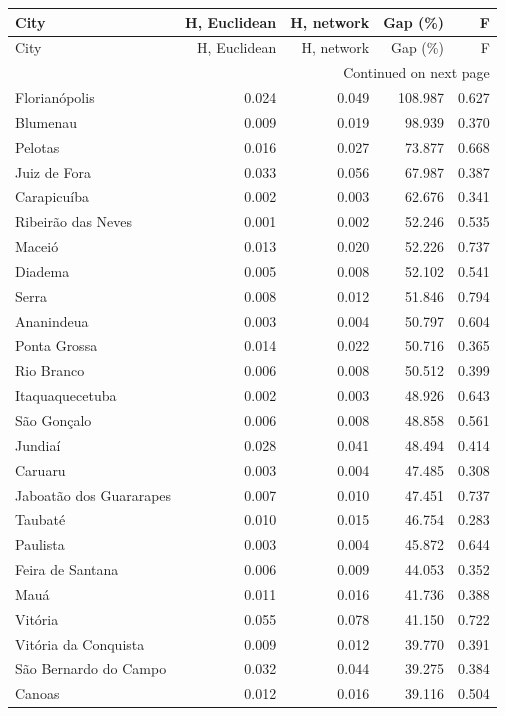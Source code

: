 \begin{longtable}{lrrrr}
\toprule
City & H, Euclidean & H, network & Gap (\%) & F \\
\midrule
\endfirsthead
\toprule
City & H, Euclidean & H, network & Gap (\%) & F \\
\midrule
\endhead
\midrule
\multicolumn{5}{r}{Continued on next page} \\
\midrule
\endfoot
\bottomrule
\endlastfoot
Florianópolis & 0.024 & 0.049 & 108.987 & 0.627 \\
Blumenau & 0.009 & 0.019 & 98.939 & 0.370 \\
Pelotas & 0.016 & 0.027 & 73.877 & 0.668 \\
Juiz de Fora & 0.033 & 0.056 & 67.987 & 0.387 \\
Carapicuíba & 0.002 & 0.003 & 62.676 & 0.341 \\
Ribeirão das Neves & 0.001 & 0.002 & 52.246 & 0.535 \\
Maceió & 0.013 & 0.020 & 52.226 & 0.737 \\
Diadema & 0.005 & 0.008 & 52.102 & 0.541 \\
Serra & 0.008 & 0.012 & 51.846 & 0.794 \\
Ananindeua & 0.003 & 0.004 & 50.797 & 0.604 \\
Ponta Grossa & 0.014 & 0.022 & 50.716 & 0.365 \\
Rio Branco & 0.006 & 0.008 & 50.512 & 0.399 \\
Itaquaquecetuba & 0.002 & 0.003 & 48.926 & 0.643 \\
São Gonçalo & 0.006 & 0.008 & 48.858 & 0.561 \\
Jundiaí & 0.028 & 0.041 & 48.494 & 0.414 \\
Caruaru & 0.003 & 0.004 & 47.485 & 0.308 \\
Jaboatão dos Guararapes & 0.007 & 0.010 & 47.451 & 0.737 \\
Taubaté & 0.010 & 0.015 & 46.754 & 0.283 \\
Paulista & 0.003 & 0.004 & 45.872 & 0.644 \\
Feira de Santana & 0.006 & 0.009 & 44.053 & 0.352 \\
Mauá & 0.011 & 0.016 & 41.736 & 0.388 \\
Vitória & 0.055 & 0.078 & 41.150 & 0.722 \\
Vitória da Conquista & 0.009 & 0.012 & 39.770 & 0.391 \\
São Bernardo do Campo & 0.032 & 0.044 & 39.275 & 0.384 \\
Canoas & 0.012 & 0.016 & 39.116 & 0.504 \\

\end{longtable}
